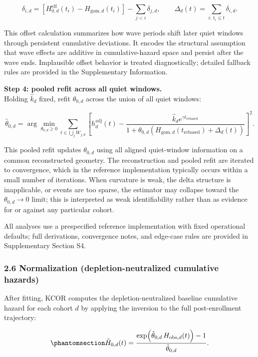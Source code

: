 \documentclass[
]{article}
\begin{document}
\[
\delta_{i,d}
=
\left[H_{0,d}^{\mathrm{eff}}(t_i)-H_{\mathrm{gom},d}(t_i)\right]-\sum_{j<i}\delta_{j,d},
\qquad
\Delta_d(t)=\sum_{i:\,t_i\le t}\delta_{i,d}.
\]

This offset calculation summarizes how wave periods shift later quiet
windows through persistent cumulative deviations. It encodes the
structural assumption that wave effects are additive in
cumulative-hazard space and persist after the wave ends. Implausible
offset behavior is treated diagnostically; detailed fallback rules are
provided in the Supplementary Information.

\textbf{Step 4: pooled refit across all quiet windows.}\\
Holding \(\hat{k}_d\) fixed, refit \(\theta_{0,d}\) across the union of
all quiet windows:

\[
\hat{\theta}_{0,d}
=
\arg\min_{\theta_{0,d}\ge0}
\sum_{t \in \bigcup_j W_{j,d}}
\left[
h_d^{\mathrm{adj}}(t)-
\frac{\hat{k}_d e^{\gamma t_{\mathrm{rebased}}}}{1+\theta_{0,d}\left(H_{\mathrm{gom},d}(t_{\mathrm{rebased}})+\Delta_d(t)\right)}
\right]^2 .
\]

This pooled refit updates \(\theta_{0,d}\) using all aligned
quiet-window information on a common reconstructed geometry. The
reconstruction and pooled refit are iterated to convergence, which in
the reference implementation typically occurs within a small number of
iterations. When curvature is weak, the delta structure is inapplicable,
or events are too sparse, the estimator may collapse toward the
\(\theta_{0,d}\to0\) limit; this is interpreted as weak identifiability
rather than as evidence for or against any particular cohort.

All analyses use a prespecified reference implementation with fixed
operational defaults; full derivations, convergence notes, and edge-case
rules are provided in Supplementary Section S4.

\subsubsection{2.6 Normalization (depletion-neutralized cumulative
hazards)}\label{normalization-depletion-neutralized-cumulative-hazards}

After fitting, KCOR computes the depletion-neutralized baseline
cumulative hazard for each cohort \(d\) by applying the inversion to the
full post-enrollment trajectory:

\begin{equation}\protect\phantomsection\label{eq:normalized-cumhazard}{
\tilde H_{0,d}(t) = \frac{\exp\!\left(\hat{\theta}_{0,d}\,H_{\mathrm{obs},d}(t)\right)-1}{\hat{\theta}_{0,d}}.
}\end{equation}
\end{document}
